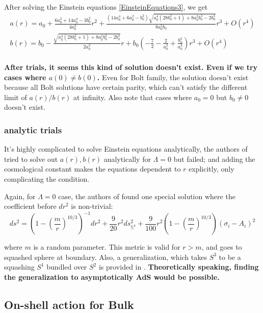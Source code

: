 \documentclass[12pt, a4paper]{article}
\numberwithin{equation}{section}
\newcommand{\be}{\begin{equation}}
\newcommand{\ee}{\end{equation}}
\begin{document}
	After solving the Einstein equations \ref{EinsteinEquations3}, we get
\be
\begin{aligned}
	a(r) = a_0 + \frac{6a_0^2+14a_0^4 -3b_0^2}{4a_0^3}r^2 + \frac{\left(14 a_0^4+6 a_0^2-b_0^2\right) \sqrt{a_0^4 \left(28 b_0^2+1\right)+8 a_0^2 b_0^2-2 b_0^4}}{8 a_0^5 b_0}r^3 + O(r^4)\\
	b(r) = b_0 -\frac{\sqrt{a_0^4 \left(28 b_0^2+1\right)+8 a_0^2 b_0^2-2 b_0^4}}{2 a_0^2}r + b_0\left(-\frac{7}{2}-\frac{2}{a_0^2} + \frac{b_0^2}{a_0^4}\right)r^3+O(r^4)\\
\end{aligned}
\ee

	\textbf{After trials, it seems this kind of solution doesn't exist. Even if we try cases where $a(0)\ne b(0)$. } Even for Bolt family, the solution doesn't exist because all Bolt solutions have certain parity, which can't satisfy the different limit of $a(r)/b(r)$ at infinity. Also note that cases where $a_0 = 0$ but $b_0\ne 0$ doesn't exist.
	
\subsubsection{analytic trials}

	It's highly complicated to solve Einstein equations analytically, the authors of \cite{Bizon:2007ss} tried to solve out $a(r), b(r)$ analytically for $\Lambda=0$ but failed; and adding the cosmological constant makes the equations dependent to $r$ explicitly, only complicating the condition. 
	
	Again, for $\Lambda = 0$ case, the authors of \cite{Gibbons:1990rb} found one special solution where the coefficient before $dr^2$ is non-trivial:
\be
	ds^2 = \left(1-\left(\frac{m}{r}\right)^{10/3}\right)^{-1} dr^2 + \frac{9}{20}r^2 ds^2_{\mathbb{S}^4} + \frac{9}{100}r^2  \left(1-\left(\frac{m}{r}\right)^{10/3}\right)(\sigma_i-A_i)^2
\ee

	where $m$ is a random parameter. This metric is valid for $r > m$, and goes to squashed sphere at boundary. \cite{Gukov:2001sm} Also, a generalization, which takes $S^3$ to be a squashing $S^1$ bundled over $S^2$ is provided in \cite{Cvetic:2001sm}. \textbf{Theoretically speaking, finding the generalization to asymptotically AdS would be possible.}
	

\subsection{On-shell action for Bulk}
\end{document}
